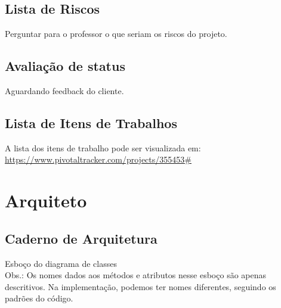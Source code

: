 \documentclass[12pt,letterpaper]{article}
\begin{document}
\pagebreak
\subsection{Lista de Riscos}

Perguntar para o professor o que seriam os riscos do projeto.

\pagebreak
\subsection{Avaliação de status}

Aguardando feedback do cliente.

\pagebreak
\subsection{Lista de Itens de Trabalhos}

A lista dos itens de trabalho pode ser visualizada em: \url{https://www.pivotaltracker.com/projects/355453#}


\pagebreak
\section{Arquiteto}

\subsection{Caderno de Arquitetura}

Esboço do diagrama de classes\\
Obs.: Os nomes dados aos métodos e atributos nesse esboço são apenas descritivos. Na implementação, podemos ter nomes diferentes, seguindo os padrões do código.\\

\end{document}
